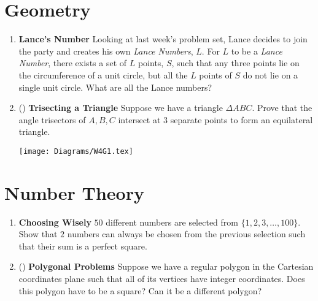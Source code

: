 \documentclass[11pt]{scrartcl}
\begin{document}
\newpage
\section{Geometry}
\begin{enumerate}[label=\textbf{G\arabic*}.]
    \item \textbf{Lance's Number} \newline
    Looking at last week's problem set, Lance decides to join the party and creates his own \textit{Lance Numbers}, $L$. For $L$ to be a \textit{Lance Number}, there exists a set of $L$ points, $S$, such that any three points lie on the circumference of a unit circle, but all the $L$ points of $S$ do not lie on a single unit circle. What are all the Lance numbers?
    
    \item (\fullchili) \textbf{Trisecting a Triangle} \newline
    Suppose we have a triangle $\Delta ABC$. Prove that the angle trisectors of $A, B, C$ intersect at $3$ separate points to form an equilateral triangle.
    \newline\newline
    \begin{center}
        \texttt{[image: Diagrams/W4G1.tex]}
    \end{center}
    
\end{enumerate}

\newpage
\section{Number Theory}
\begin{enumerate}[label=\textbf{N\arabic*}.]
    \item \textbf{Choosing Wisely} \newline
    $50$ different numbers are selected from $\{1, 2, 3, \dots, 100\}$. Show that $2$ numbers can always be chosen from the previous selection such that their sum is a perfect square.
    
    \item (\halfchili) \textbf{Polygonal Problems} \newline
    Suppose we have a regular polygon in the Cartesian coordinates plane such that all of its vertices have integer coordinates. Does this polygon have to be a square? Can it be a different polygon?
\end{enumerate}
\end{document}
